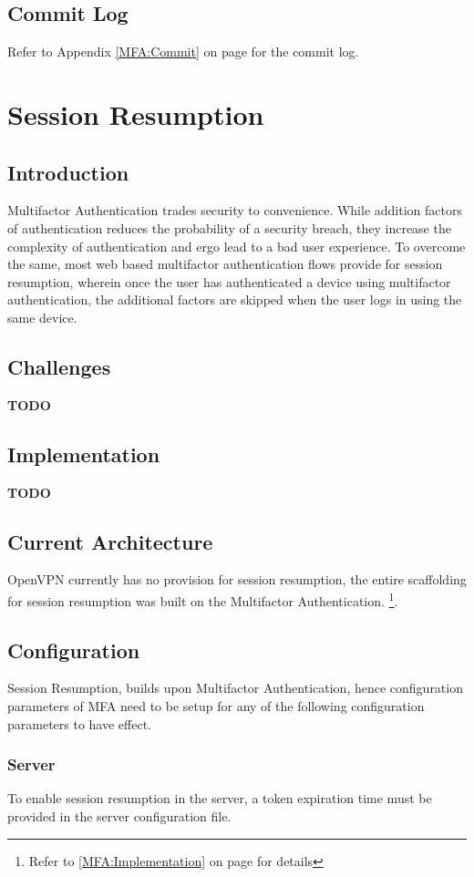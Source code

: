 \documentclass[11pt,oneside]{book}
\begin{document}
\section{Commit Log}
Refer to Appendix \ref{MFA:Commit} on page \pageref{MFA:Commit} for the commit log.

\chapter{Session Resumption}
\section{Introduction}
Multifactor Authentication trades security to convenience. While addition factors of authentication
reduces the probability of a security breach, they increase the complexity of authentication and
ergo lead to a bad user experience. To overcome the same, most web based multifactor authentication
flows provide for session resumption, wherein once the user has authenticated a device using
multifactor authentication, the additional factors are skipped when the user logs in using the same
device.

\section{Challenges}
\textbf{TODO}

\section{Implementation}
\textbf{TODO}

\section{Current Architecture}
OpenVPN currently has no provision for session resumption, the entire scaffolding for session
resumption was built on the Multifactor Authentication. \footnote{ Refer to \ref{MFA:Implementation}
on page \pageref{MFA:Implementation} for details}.

\section{Configuration}
Session Resumption, builds upon Multifactor Authentication, hence configuration parameters of MFA
need to be setup for any of the following configuration parameters to have effect.

\subsection{Server}
To enable session resumption in the server, a token expiration time must be provided in the server
configuration file.
\end{document}
